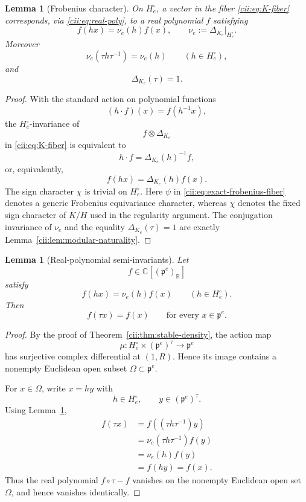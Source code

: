 \documentclass[11pt,reqno]{amsart}
\numberwithin{equation}{section}
\newtheorem{lemma}[theorem]{Lemma}
\theoremstyle{definition}
\theoremstyle{remark}
\newcommand{\C}{\mathbb C}
\newcommand{\R}{\mathbb R}
\begin{document}
\begin{lemma}[Frobenius character]
\label{cii:lem:frobenius-character}
On \(H_e^\circ\), a vector in the fiber
\eqref{cii:eq:K-fiber} corresponds, via \eqref{cii:eq:real-poly}, to a real polynomial \(f\) satisfying
\[
f(hx)=\nu_e(h)f(x),
\qquad
\nu_e:=\Delta_{K_e}|_{H_e^\circ}.
\]
Moreover
\[
\nu_e(\tau h\tau^{-1})=\nu_e(h)
\qquad(h\in H_e^\circ),
\]
and
\[
\Delta_{K_e}(\tau)=1.
\]
\end{lemma}

\begin{proof}
With the standard action on polynomial functions
\[
(h\cdot f)(x)=f(h^{-1}x),
\]
the \(H_e^\circ\)-invariance of
\[
f\otimes\Delta_{K_e}
\]
in \eqref{cii:eq:K-fiber} is equivalent to
\[
h\cdot f=\Delta_{K_e}(h)^{-1}f,
\]
or, equivalently,
\[
f(hx)=\Delta_{K_e}(h)f(x).
\]
The sign character $\chi$ is trivial on \(H_e^\circ\).  Here $\psi$ in
\eqref{cii:eq:exact-frobenius-fiber} denotes a generic Frobenius
equivariance character, whereas $\chi$ denotes the fixed sign character of
$K/H$ used in the regularity argument.
The conjugation invariance of \(\nu_e\) and the equality
\(\Delta_{K_e}(\tau)=1\) are exactly
Lemma~\ref{cii:lem:modular-naturality}.
\end{proof}

\begin{lemma}[Real-polynomial semi-invariants]
\label{cii:lem:real-semiinvariant}
Let
\[
f\in\C[(\mathfrak p^e)_{\R}]
\]
satisfy
\[
f(hx)=\nu_e(h)f(x)
\qquad(h\in H_e^\circ).
\]
Then
\[
f(\tau x)=f(x)
\qquad
\text{for every }x\in\mathfrak p^e.
\]
\end{lemma}

\begin{proof}
By the proof of Theorem~\ref{cii:thm:stable-density}, the action map
\[
\mu:
H_e^\circ\times(\mathfrak p^e)^\tau
\longrightarrow
\mathfrak p^e
\]
has surjective complex differential at \((1,R)\).  Hence its image contains
a nonempty Euclidean open subset
\(\Omega\subset\mathfrak p^e\).

For \(x\in\Omega\), write \(x=hy\) with
\[
h\in H_e^\circ,\qquad
y\in(\mathfrak p^e)^\tau.
\]
Using Lemma~\ref{cii:lem:frobenius-character},
\[
\begin{aligned}
f(\tau x)
&=f((\tau h\tau^{-1})y)\\
&=\nu_e(\tau h\tau^{-1})f(y)\\
&=\nu_e(h)f(y)\\
&=f(hy)=f(x).
\end{aligned}
\]
Thus the real polynomial \(f\circ\tau-f\) vanishes on the nonempty
Euclidean open set \(\Omega\), and hence vanishes identically.
\end{proof}
\end{document}
